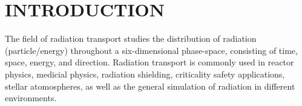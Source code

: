 %
%
%
%



\pagestyle{plain} %
\setcounter{page}{1}


\chapter{\uppercase {INTRODUCTION}}\label{cha:introduction}


The field of radiation transport studies the distribution of radiation (particle/energy) throughout a six-dimensional phase-space, consisting of time, space, energy, and direction.
Radiation transport is commonly used in reactor physics, medicial physics, radiation shielding, criticality safety applications, stellar atomospheres, as well as the general simulation of radiation in different environments.

